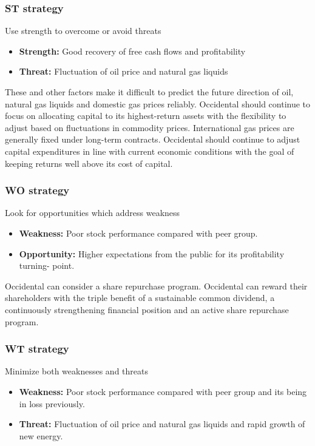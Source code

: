 \documentclass[
	a4paper, %
	12pt,%
]{CSSullivanBusinessReport}
\begin{document}
\begin{fullwidth}
\subsubsection{ST strategy}
Use strength to overcome or avoid threats\par
\begin{itemize}
    \item \textbf{Strength:} Good recovery of free cash flows and profitability
    \item \textbf{Threat:} Fluctuation of oil price and natural gas liquids
\end{itemize}
These and other factors make it difficult to predict the future direction of oil, natural gas liquids and domestic gas prices reliably. Occidental should continue to focus on allocating capital to its highest-return assets with the flexibility to adjust based on fluctuations in commodity prices. International gas prices are generally fixed under long-term contracts. Occidental should continue to adjust capital expenditures in line with current economic conditions with the goal of keeping returns well above its cost of capital. 
\subsubsection{WO strategy}
Look for opportunities which address weakness\par
\begin{itemize}
    \item \textbf{Weakness:} Poor stock performance compared with peer group.
    \item \textbf{Opportunity:} Higher expectations from the public for its profitability turning- point.
\end{itemize}
Occidental can consider a share repurchase program. Occidental can reward their shareholders with the triple benefit of a sustainable common dividend, a continuously strengthening financial position and an active share repurchase program.
\subsubsection{WT strategy}
Minimize both weaknesses and threats\par
\begin{itemize}
    \item \textbf{Weakness:} Poor stock performance compared with peer group and its being in loss previously.
    \item \textbf{Threat:} Fluctuation of oil price and natural gas liquids and rapid growth of new energy.
\end{itemize}


\end{fullwidth}
\end{document}
